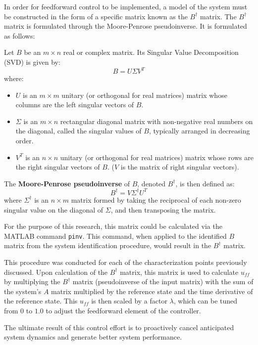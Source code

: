 In order for feedforward control to be implemented, a model of the system must be constructed in the form of a specific matrix known as the $B^\dagger$ matrix. The $B^\dagger$ matrix is formulated through the Moore-Penrose pseudoinverse. It is formulated as follows:

Let $B$ be an $m \times n$ real or complex matrix. Its Singular Value Decomposition (SVD) is given by:
$$B = U \Sigma V^T$$
where:
\begin{itemize}
    \item $U$ is an $m \times m$ unitary (or orthogonal for real matrices) matrix whose columns are the left singular vectors of $B$.
    \item $\Sigma$ is an $m \times n$ rectangular diagonal matrix with non-negative real numbers on the diagonal, called the singular values of $B$, typically arranged in decreasing order.
    \item $V^T$ is an $n \times n$ unitary (or orthogonal for real matrices) matrix whose rows are the right singular vectors of $B$. ($V$ is the matrix of right singular vectors).
\end{itemize}

The \textbf{Moore-Penrose pseudoinverse} of $B$, denoted $B^\dagger$, is then defined as:
$$B^\dagger = V \Sigma^\dagger U^T$$
where $\Sigma^\dagger$ is an $n \times m$ matrix formed by taking the reciprocal of each non-zero singular value on the diagonal of $\Sigma$, and then transposing the matrix.



For the purpose of this research, this matrix could be calculated via the MATLAB command \texttt{pinv}. This command, when applied to the identified $B$ matrix from the system identification procedure, would result in the $B^\dagger$ matrix.


This procedure was conducted for each of the characterization points previously discussed. Upon calculation of the $B^\dagger$ matrix, this matrix is used to calculate $u_{ff}$ by multiplying the $B^\dagger$ matrix (pseudoinverse of the input matrix) with the sum of the system's $A$ matrix multiplied by the reference state and the time derivative of the reference state. This $u_{ff}$ is then scaled by a factor $\lambda$, which can be tuned from $0$ to $1.0$ to adjust the feedforward element of the controller.

The ultimate result of this control effort is to proactively cancel anticipated system dynamics and generate better system performance.

